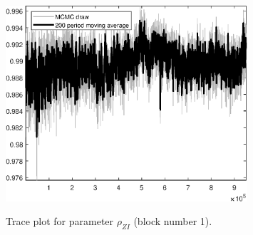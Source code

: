 \begin{figure}[H]
\centering
  \includegraphics[width=0.8\textwidth]{BRS_growth_util_sectoral/graphs/TracePlot_rho_ZI_blck_1}\\
    \caption{Trace plot for parameter ${\rho_{ZI}}$ (block number 1).}
\end{figure}
